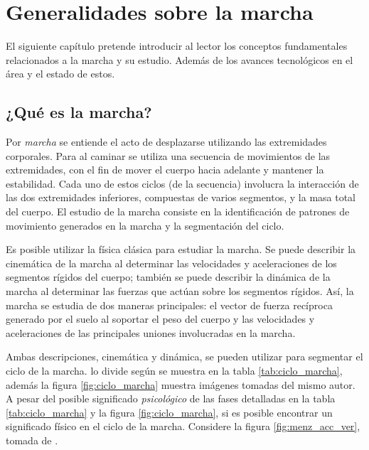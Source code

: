 \chapter[Generalidades]{Generalidades sobre la marcha}

El siguiente capítulo pretende introducir al lector los conceptos fundamentales relacionados a la marcha y su estudio. Además de los avances tecnológicos en el área y el estado de estos.

\section{¿Qué es la marcha?}

Por \emph{marcha} se entiende el acto de desplazarse utilizando las extremidades corporales. Para \cite{perry} al caminar se utiliza una secuencia de movimientos de las extremidades, con el fin de mover el cuerpo hacia adelante y mantener la estabilidad. Cada uno de estos ciclos (de la secuencia) involucra la interacción de las dos extremidades inferiores, compuestas de varios segmentos, y la masa total del cuerpo. El estudio de la marcha consiste en la identificación de patrones de movimiento generados en la marcha y la segmentación del ciclo.

Es posible utilizar la física clásica para estudiar la marcha. Se puede describir la cinemática de la marcha al determinar las velocidades y aceleraciones de los segmentos rígidos del cuerpo; también se puede describir la dinámica de la marcha al determinar las fuerzas que actúan sobre los segmentos rígidos. Así, la marcha se estudia de dos maneras principales: el vector de fuerza recíproca generado por el suelo al soportar el peso del cuerpo y las velocidades y aceleraciones de las principales uniones involucradas en la marcha. \citep{perry}

Ambas descripciones, cinemática y dinámica, se pueden utilizar para segmentar el ciclo de la marcha. \cite{perry} lo divide según se muestra en la tabla \ref{tab:ciclo_marcha}, además la figura \ref{fig:ciclo_marcha} muestra imágenes tomadas del mismo autor. A pesar del posible significado \emph{psicológico} de las fases detalladas en la tabla \ref{tab:ciclo_marcha} y la figura \ref{fig:ciclo_marcha}, si es posible encontrar un significado físico en el ciclo de la marcha. Considere la figura \ref{fig:menz_acc_ver}, tomada de \citep{menz}.


